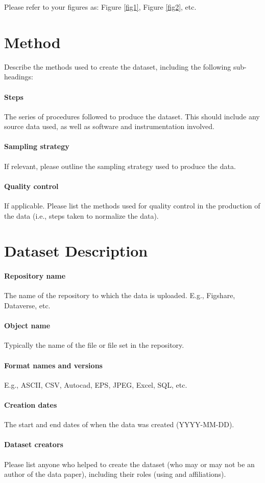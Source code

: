 \documentclass{article}
\begin{document}
\noindent Please refer to your figures as: Figure \ref{fig1}, Figure \ref{fig2}, etc.

\section{Method}
Describe the methods used to create the dataset, including the following sub-headings:
\paragraph{Steps} The series of procedures followed to produce the dataset. This should include any source data used, as well as software and instrumentation involved.
\paragraph{Sampling strategy} If relevant, please outline the sampling strategy used to produce the data.
\paragraph{Quality control} If applicable. Please list the methods used for quality control in the production of the data (i.e., steps taken to normalize the data).

\section{Dataset Description}
\paragraph{Repository name} The name of the repository to which the data is uploaded. E.g., Figshare, Dataverse, etc. 
\paragraph{Object name} Typically the name of the file or file set in the repository.
\paragraph{Format names and versions} E.g., ASCII, CSV, Autocad, EPS, JPEG, Excel, SQL, etc.
\paragraph{Creation dates} The start and end dates of when the data was created (YYYY-MM-DD).
\paragraph{Dataset creators} Please list anyone who helped to create the dataset (who may or may not be an author of the data paper), including their roles (using and affiliations).
\end{document}
